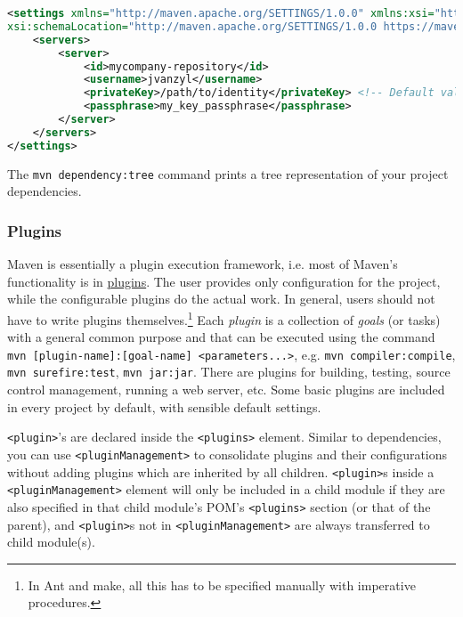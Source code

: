 \documentclass[8pt, table, xcdraw]{article}%
\begin{document}
\begin{lstlisting}[language=XML]
<settings xmlns="http://maven.apache.org/SETTINGS/1.0.0" xmlns:xsi="http://www.w3.org/2001/XMLSchema-instance"
xsi:schemaLocation="http://maven.apache.org/SETTINGS/1.0.0 https://maven.apache.org/xsd/settings-1.0.0.xsd">
    <servers>
        <server>
            <id>mycompany-repository</id>
            <username>jvanzyl</username>
            <privateKey>/path/to/identity</privateKey> <!-- Default value is ~/.ssh/id_dsa -->
            <passphrase>my_key_passphrase</passphrase>
        </server>
    </servers>
</settings>
\end{lstlisting}

The \lstinline{mvn dependency:tree} command prints a tree representation of your project dependencies.

\subsubsection{Plugins}

Maven is essentially a plugin execution framework, i.e. most of Maven's functionality is in \href{https://maven.apache.org/guides/getting-started/index.html}{plugins}. The user provides only configuration for the project, while the configurable plugins do the actual work. In general, users should not have to write plugins themselves.\footnote{In Ant and make, all this has to be specified manually with imperative procedures.} Each \emph{plugin} is a collection of \emph{goals} (or tasks) with a general common purpose and that can be executed using the command \lstinline{mvn [plugin-name]:[goal-name] <parameters...>}, e.g. \lstinline{mvn compiler:compile}, \lstinline{mvn surefire:test}, \lstinline{mvn jar:jar}. There are plugins for building, testing, source control management, running a web server, etc. Some basic plugins are included in every project by default, with sensible default settings.

\lstinline{<plugin>}'s are declared inside the \lstinline{<plugins>} element. Similar to dependencies, you can use \lstinline{<pluginManagement>} to consolidate plugins and their configurations without adding plugins which are inherited by all children. \lstinline{<plugin>}s inside a \lstinline{<pluginManagement>} element will only be included in a child module if they are also specified in that child module's POM's \lstinline{<plugins>} section (or that of the parent), and \lstinline{<plugin>}s not in \lstinline{<pluginManagement>} are always transferred to child module(s).
\end{document}
